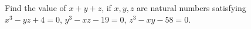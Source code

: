 Find the value of $x+y+z$, if $x,y,z$ are natural numbers satisfying $x^{3}-yz+4=0$, $y^{3}-xz-19=0$, $z^{3}-xy-58=0$.
